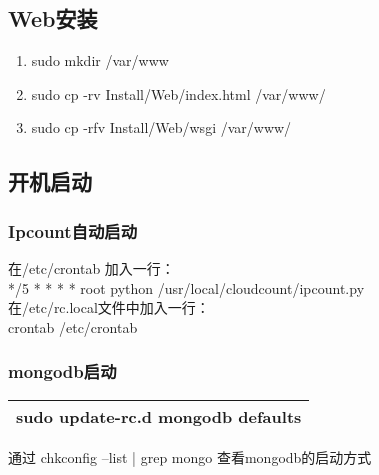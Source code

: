 \documentclass[10pt]{article}
\begin{document}
\bigskip
\subsection{Web安装}
\begin{enumerate}

    \item sudo mkdir /var/www
    \item sudo cp -rv Install/Web/index.html /var/www/
    \item sudo cp -rfv Install/Web/wsgi /var/www/
\end{enumerate}


\bigskip
\subsection{开机启动}
\subsubsection{Ipcount自动启动} 
		在/etc/crontab 加入一行： \\
			*/5 *	* * *	root	python /usr/local/cloudcount/ipcount.py\\
		在/etc/rc.local文件中加入一行： \\
			crontab /etc/crontab
\subsubsection{mongodb启动}

\begin{center}
\begin{tabular}{|p{10cm}|}
\hline
		sudo update-rc.d mongodb defaults 
\\\hline
\end{tabular}
\end{center}
通过 chkconfig --list | grep mongo 查看mongodb的启动方式

		
\bigskip


\clearpage
\end{document}
